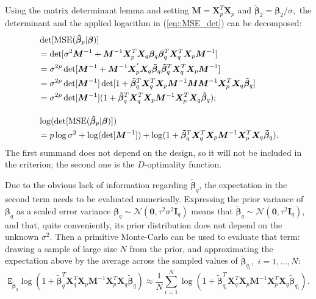 Using the matrix determinant lemma \citep{Harville2006matrix} and setting $\bm{M}=\bm{X}_p^{T}\bm{X}_p$ and $\bm{\tilde{\beta}}_2=\bm{\beta}_2/\sigma,$ the determinant and the applied logarithm in (\ref{eq::MSE_det}) can be decomposed:
\begin{align*}
&\det[\mbox{MSE}(\bm{\hat{\beta}}_p|\bm{\beta})]\notag\\&=\det[\sigma^2\bm{M}^{-1}+\bm{M}^{-1}\bm{X}_p^{T}\bm{X}_q\bm{\beta}_q\bm{\beta}_q^T\bm{X}_q^{T}\bm{X}_p\bm{M}^{-1}]\notag\\&=\sigma^{2p}\det[\bm{M}^{-1}+\bm{M}^{-1}\bm{X}_p^{'}\bm{X}_q\bm{\tilde{\beta}}_q\bm{\tilde{\beta}}_q^T\bm{X}_q^{T}\bm{X}_p\bm{M}^{-1}]\notag\\&=\sigma^{2p}\det[\bm{M}^{-1}]\det[1+\bm{\tilde{\beta}}_q^T\bm{X}_q^{T}\bm{X}_p\bm{M}^{-1}\bm{M}\bm{M}^{-1}\bm{X}_p^{T}\bm{X}_q\bm{\tilde{\beta}}_q]\notag\\&=\sigma^{2p}\det[\bm{M}^{-1}](1+\bm{\tilde{\beta}}_q^T\bm{X}_q^{T}\bm{X}_p\bm{M}^{-1}\bm{X}_p^{T}\bm{X}_q\bm{\tilde{\beta}}_q);\\[10pt]
&\log(\det[\mbox{MSE}(\bm{\hat{\beta}}_p|\bm{\beta})])\notag\\&=p\log\sigma^2+\log(\det[\bm{M}^{-1}])+\log(1+\bm{\tilde{\beta}}_q^T\bm{X}_q^{T}\bm{X}_p\bm{M}^{-1}\bm{X}_p^{T}\bm{X}_q\bm{\tilde{\beta}}_q). 
\end{align*}
The first summand does not depend on the design, so it will not be included in the criterion; the second one is the $D$-optimality function. 

Due to the obvious lack of information regarding $\bm{\tilde{\beta}}_q$, the expectation in the second term needs to be evaluated numerically. Expressing the prior variance of $\bm{\beta}_q$ as a scaled error variance $\bm{\beta}_q \sim \mathcal{N}(\bm{0},\tau^{2}\sigma^{2}\bm{I}_{q})$ means that $\bm{\tilde{\beta}}_q \sim \mathcal{N}(\bm{0},\tau^{2}\bm{I}_{q})$, and that, quite conveniently, its prior distribution does not depend on the unknown $\sigma^2.$ Then a primitive Monte-Carlo can be used to evaluate that term: drawing a sample of large size $N$ from the prior, and approximating the expectation above by the average across the sampled values of $\bm{\tilde{\beta}}_{q_i},$ $i=1,\dots, N$:
\begin{equation*}
\mathtt{E}_{\bm{\tilde{\beta}}_q}\log(1+\bm{\tilde{\beta}}_q^T\bm{X}_q^{T}\bm{X}_p\bm{M}^{-1}\bm{X}_p^{T}\bm{X}_q\bm{\tilde{\beta}}_q) \approx \frac{1}{N}\sum_{i=1}^{N}\log(1+\bm{\tilde{\beta}}_{q_i}^T\bm{X}_q^{T}\bm{X}_p\bm{M}^{-1}\bm{X}_p^{T}\bm{X}_q\bm{\tilde{\beta}}_{q_i}).
\end{equation*} 

